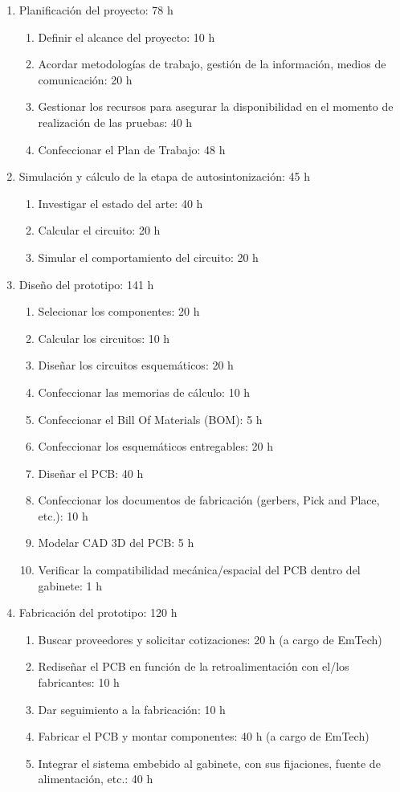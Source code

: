 \documentclass[
11pt, %
]{charter}
\begin{document}
\begin{enumerate}
\item Planificación del proyecto: 78 h
	\begin{enumerate}
	\item Definir el alcance del proyecto: 10 h
	\item Acordar metodologías de trabajo, gestión de la información, medios de comunicación: 20 h
	\item Gestionar los recursos para asegurar la disponibilidad en el momento de realización de las pruebas: 40 h
	\item Confeccionar el Plan de Trabajo: 48 h
	\end{enumerate}

\item Simulación y cálculo de la etapa de autosintonización: 45 h
	\begin{enumerate}
	\item Investigar el estado del arte: 40 h
	\item Calcular el circuito: 20 h
	\item Simular el comportamiento del circuito: 20 h 
	\end{enumerate}
	
\item Diseño del prototipo: 141 h
	\begin{enumerate}
	\item Selecionar los componentes: 20 h
	\item Calcular los circuitos: 10 h
	\item Diseñar los circuitos esquemáticos: 20 h
	\item Confeccionar las memorias de cálculo: 10 h
	\item Confeccionar el Bill Of Materials (BOM): 5 h
	\item Confeccionar los esquemáticos entregables: 20 h
	\item Diseñar el PCB: 40 h
	\item Confeccionar los documentos de fabricación (gerbers, Pick and Place, etc.): 10 h
	\item Modelar CAD 3D del PCB: 5 h
	\item Verificar la compatibilidad mecánica/espacial del PCB dentro del gabinete: 1 h
	\end{enumerate}
	
\item Fabricación del prototipo: 120 h
	\begin{enumerate}
	\item Buscar proveedores y solicitar cotizaciones: 20 h (a cargo de EmTech)
	\item Rediseñar el PCB en función de la retroalimentación con el/los fabricantes: 10 h 
	\item Dar seguimiento a la fabricación: 10 h
	\item Fabricar el PCB y montar componentes: 40 h (a cargo de EmTech)
	\item Integrar el sistema embebido al gabinete, con sus fijaciones, fuente de alimentación, etc.: 40 h
    \end{enumerate}
    

\end{enumerate}
\end{document}
